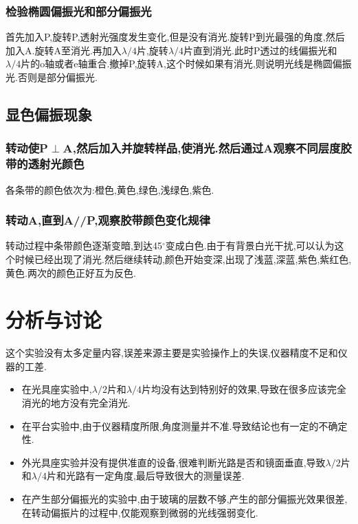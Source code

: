 \documentclass[a4paper,10pt,notitlepage]{article}
\begin{document}
\subsubsection{检验椭圆偏振光和部分偏振光}

	首先加入P,旋转P,透射光强度发生变化,但是没有消光.旋转P到光最强的角度,然后加入A.旋转A至消光.再加入$\lambda / 4$片,旋转$\lambda / 4$片直到消光.此时P透过的线偏振光和$\lambda / 4$片的o轴或者e轴重合.撤掉P,旋转A,这个时候如果有消光,则说明光线是椭圆偏振光.否则是部分偏振光. \\
	
\subsection{显色偏振现象}

\subsubsection{转动使P$\perp$A,然后加入并旋转样品,使消光.然后通过A观察不同层度胶带的透射光颜色}

	各条带的颜色依次为:橙色,黄色,绿色,浅绿色,紫色. \\
	
\subsubsection{转动A,直到A//P,观察胶带颜色变化规律}

	转动过程中条带颜色逐渐变暗,到达45$^{\circ}$变成白色.由于有背景白光干扰,可以认为这个时候已经出现了消光.然后继续转动,颜色开始变深,出现了浅蓝,深蓝,紫色,紫红色,黄色.两次的颜色正好互为反色. \\
	
\section{分析与讨论}

	这个实验没有太多定量内容,误差来源主要是实验操作上的失误,仪器精度不足和仪器的工差. \\
	
\begin{itemize}
	\item 在光具座实验中,$\lambda / 2$片和$\lambda / 4$片均没有达到特别好的效果,导致在很多应该完全消光的地方没有完全消光.
	\item 在平台实验中,由于仪器精度所限,角度测量并不准.导致结论也有一定的不确定性.
	\item 外光具座实验并没有提供准直的设备,很难判断光路是否和镜面垂直,导致$\lambda / 2$片和$\lambda / 4$片和光路有一定角度,最后导致很大的测量误差.
	\item 在产生部分偏振光的实验中,由于玻璃的层数不够,产生的部分偏振光效果很差,在转动偏振片的过程中,仅能观察到微弱的光线强弱变化.
\end{itemize}
\end{document}
